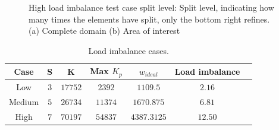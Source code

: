 \begin{figure}[H]
	\centering
	\hfill
	\caption{High load imbalance test case split level: Split level, indicating how many times the elements have split, only the bottom right refines. (a) Complete domain (b) Area of interest}\label{fig:load_imbalance_case_high_s}
\end{figure}

\begin{table}[H]
	\centering
	\begin{tabular}{ c c c c c c c }
		Case & S & K & Max \(K_p\) & \(w_{ideal}\) & Load imbalance \\
		\midrule
		Low & \(3\) & \(17752\) & \(2392\) & \(1109.5\) & \(2.16\) \\
		Medium & \(5\) & \(26734\) & \(11374\) & \(1670.875\) & \(6.81\) \\
		High & \(7\) & \(70197\) & \(54837\) & \(4387.3125\) & \(12.50\) \\
	\end{tabular}
	\caption{Load imbalance cases.}\label{table:load_imbalance}
\end{table}

